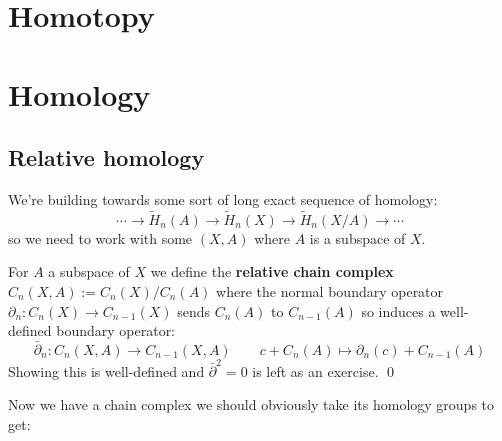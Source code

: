 \documentclass[a4paper]{article}
\begin{document}
\newlength{\edgelentgh}
\setlength{\edgelentgh}{3cm}

\renewcommand*\thesection{\arabic{section}}

\section{Homotopy}










\section{Homology}




\subsection{Relative homology}

We're building towards some sort of long exact sequence of homology:\[
    \cdots \rightarrow \tilde{H}_n(A)\rightarrow \tilde{H}_n(X)\rightarrow \tilde{H}_n(X/A)\rightarrow \cdots
\]
so we need to work with some $(X,A)$ where $A$ is a subspace of $X$.

\begin{dfn}
    For $A$ a subspace of $X$ we define the \textbf{relative chain complex} $C_n(X,A):= C_n(X)/C_n(A)$ where the normal boundary operator $\partial_n:C_n(X)\rightarrow C_{n-1}(X)$ sends $C_n(A)$ to $C_{n-1}(A)$ so induces a well-defined boundary operator: \[
        \bar{\partial}_n:C_n(X,A)\rightarrow C_{n-1}(X,A) \qquad c + C_n(A) \mapsto \partial_n(c) + C_{n-1}(A)
    \]
    Showing this is well-defined and $\bar{\partial}^2=0$ is left as an exercise. \qed
\end{dfn}
Now we have a chain complex we should obviously take its homology groups to get:
\end{document}
